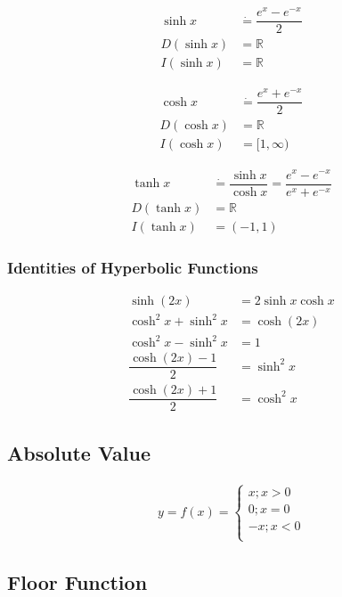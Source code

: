 \documentclass[fleqn]{article}
\theoremstyle{definition}
\theoremstyle{theorem}
\theoremstyle{remark}
\begin{document}
\begin{align}
	\sinh x &\dot{=} \dfrac{e^x - e^{-x}}{2} \\
	D(\sinh x) &= \mathbb{R} \\
	I(\sinh x) &= \mathbb{R}
\end{align}

\begin{align}
	\cosh x &\dot{=} \dfrac{e^x + e^{-x}}{2} \\
	D(\cosh x) &= \mathbb{R} \\
	I(\cosh x) &= [1, \infty)
\end{align}

\begin{align}
	\tanh x &\dot{=} \dfrac{\sinh x}{\cosh x} = \dfrac{e^x - e^{-x}}{e^x + e^{-x}} \\
	D(\tanh x) &= \mathbb{R} \\
	I(\tanh x) &= (-1, 1)
\end{align}

\subsubsection{Identities of Hyperbolic Functions}

\begin{align}
	\sinh (2x) &= 2 \sinh x \cosh x \\
	\cosh ^2 x + \sinh ^2 x &= \cosh (2x) \\
	\cosh ^2 x - \sinh ^2 x &= 1 \\
	\dfrac{\cosh (2x) - 1}{2} &= \sinh ^2 x \\
	\dfrac{\cosh (2x) + 1}{2} &= \cosh ^2 x 
\end{align}

\subsection{Absolute Value}

\begin{align}
	y = f(x) = 
	\begin{cases}
		x ; x > 0 \\
		0 ; x = 0 \\
		-x ; x < 0 \\
	\end{cases}
\end{align}

\subsection{Floor Function}
\end{document}
